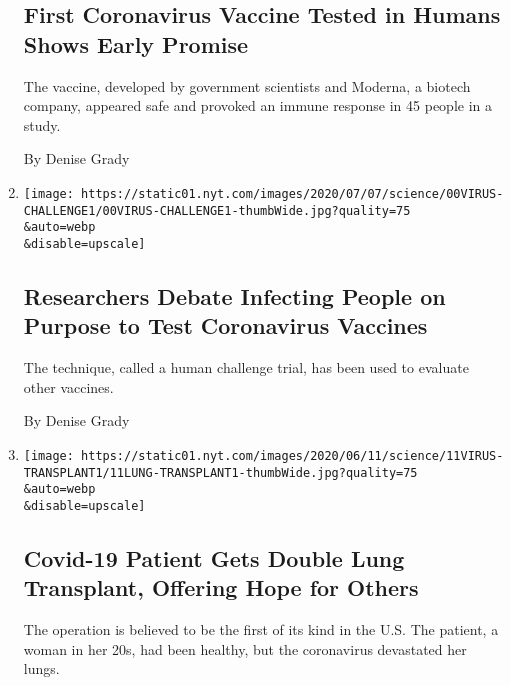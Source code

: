 \begin{enumerate}
  \hypertarget{first-coronavirus-vaccine-tested-in-humans-shows-early-promise}{%
  \subsection{First Coronavirus Vaccine Tested in Humans Shows Early
  Promise}\label{first-coronavirus-vaccine-tested-in-humans-shows-early-promise}}

  The vaccine, developed by government scientists and Moderna, a biotech
  company, appeared safe and provoked an immune response in 45 people in
  a study.

  By Denise Grady
\item
  \href{/2020/07/01/health/coronavirus-vaccine-trials.html}{}

  \texttt{[image: https://static01.nyt.com/images/2020/07/07/science/00VIRUS-CHALLENGE1/00VIRUS-CHALLENGE1-thumbWide.jpg?quality=75\\\&auto=webp\\\&disable=upscale]}

  \hypertarget{researchers-debate-infecting-people-on-purpose-to-test-coronavirus-vaccines}{%
  \subsection{Researchers Debate Infecting People on Purpose to Test
  Coronavirus
  Vaccines}\label{researchers-debate-infecting-people-on-purpose-to-test-coronavirus-vaccines}}

  The technique, called a human challenge trial, has been used to
  evaluate other vaccines.

  By Denise Grady
\item
  \href{/2020/06/11/health/coronavirus-lung-transplant.html}{}

  \texttt{[image: https://static01.nyt.com/images/2020/06/11/science/11VIRUS-TRANSPLANT1/11LUNG-TRANSPLANT1-thumbWide.jpg?quality=75\\\&auto=webp\\\&disable=upscale]}

  \hypertarget{covid-19-patient-gets-double-lung-transplant-offering-hope-for-others}{%
  \subsection{Covid-19 Patient Gets Double Lung Transplant, Offering
  Hope for
  Others}\label{covid-19-patient-gets-double-lung-transplant-offering-hope-for-others}}

  The operation is believed to be the first of its kind in the U.S. The
  patient, a woman in her 20s, had been healthy, but the coronavirus
  devastated her lungs.


\end{enumerate}
